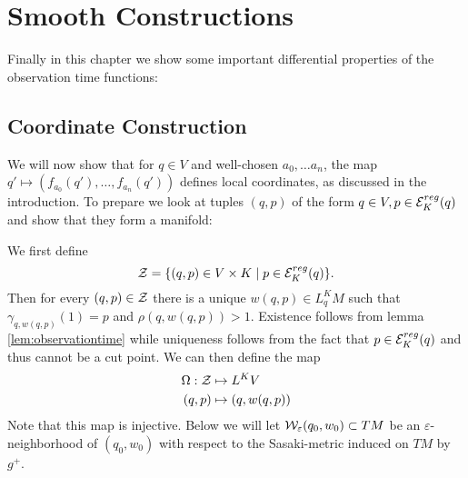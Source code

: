 \section{Smooth Constructions}
Finally in this chapter we show some important differential properties of the observation time functions:  
\subsection{Coordinate Construction}
We will now show that for $q\in V$ and well-chosen $a_0,\dots a_n$, the map $q'\mapsto (f_{a_0}(q'), \dots, f_{a_n}(q'))$ defines local coordinates, as discussed in the introduction.
To prepare we look at tuples $(q,p)$ of the form $q\in V, p\in {{\mathcal{E}}^{reg}_K}(q)$ and show that they form a manifold:
\begin{definition}[Coordinates on $V$]
    We first define 
    \[
        {\mathcal{Z}} = \{(q,p)\in V\times K \mid p\in {\mathcal{E}}_K^{reg}(q)\}.
    \] 
    Then for every $(q,p)\in {\mathcal{Z}}$ there is a unique $w(q,p)\in L^K_qM$ such that $\gamma_{q,w(q,p)}(1)=p$ and $\rho(q,w(q,p))>1$. Existence follows from lemma \ref{lem:observationtime} while uniqueness follows from the fact that $p\in {\mathcal{E}}_K^{reg}(q)$ and thus cannot be a cut point. 
    We can then define the map
    \begin{align*}
        \Omega:{\mathcal{Z}}&\mapsto L^KV\\
        (q,p)&\mapsto (q,w(q,p))
    \end{align*}
    Note that this map is injective.
    Below we will let ${\mathcal{W}}_\varepsilon(q_0,w_0)\subset TM$ be an $\varepsilon$-neighborhood of $(q_0,w_0)$ with respect to the Sasaki-metric induced on $TM$ by $g^+$.
\end{definition}

